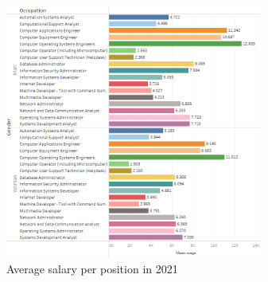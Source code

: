 \begin{figure}[htbp]
	\centerline{
		\includegraphics[width=85mm]{assets/5_sal_cbo.PNG}
	}
	\caption{Average salary per position in 2021}
	\label{fig_5_sal_cbo}
\end{figure}
